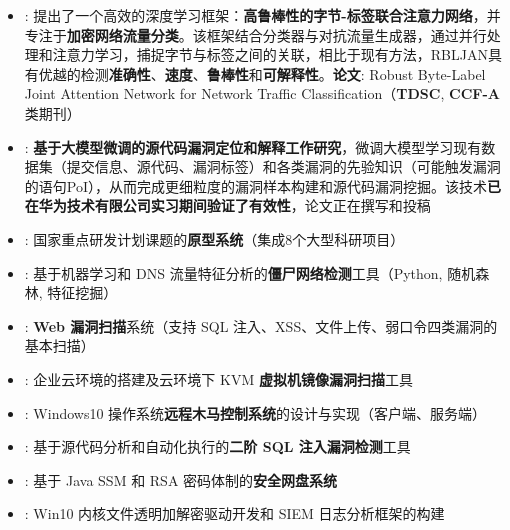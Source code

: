 \documentclass[zh]{resume}
\begin{document}
{}
\vspace{-0.2cm}
\begin{itemize}
  \item {}:
    提出了一个高效的深度学习框架：\textbf{高鲁棒性的字节-标签联合注意力网络}，并专注于\textbf{加密网络流量分类}。该框架结合分类器与对抗流量生成器，通过并行处理和注意力学习，捕捉字节与标签之间的关联，相比于现有方法，RBLJAN具有优越的检测\textbf{准确性}、\textbf{速度}、\textbf{鲁棒性}和\textbf{可解释性}。\textbf{论文}: Robust Byte-Label Joint Attention Network for Network Traffic Classification（\textbf{TDSC}, \textbf{CCF-A}类期刊）
  \item {}:
    \textbf{基于大模型微调的源代码漏洞定位和解释工作研究}，微调大模型学习现有数据集（提交信息、源代码、漏洞标签）和各类漏洞的先验知识（可能触发漏洞的语句PoI），从而完成更细粒度的漏洞样本构建和源代码漏洞挖掘。该技术\textbf{已在华为技术有限公司实习期间验证了有效性}，论文正在撰写和投稿
\end{itemize}
\vspace{-0.1cm}
{}
\vspace{-0.2cm}
\begin{itemize}
  \item {}:
    国家重点研发计划课题的\textbf{原型系统}（集成8个大型科研项目）
  \item {}:
    基于机器学习和 DNS 流量特征分析的\textbf{僵尸网络检测}工具（Python, 随机森林, 特征挖掘）
  \item {}:
   \textbf{ Web 漏洞扫描}系统（支持 SQL 注入、XSS、文件上传、弱口令四类漏洞的基本扫描）
  \item {}:
    企业云环境的搭建及云环境下 KVM \textbf{虚拟机镜像漏洞扫描}工具 
  \item {}:
    Windows10 操作系统\textbf{远程木马控制系统}的设计与实现（客户端、服务端）
  \item {}:
    基于源代码分析和自动化执行的\textbf{二阶 SQL 注入漏洞检测}工具 
  \item {}:
    基于 Java SSM 和 RSA 密码体制的\textbf{安全网盘系统} 
  \item {}:
    Win10 内核文件透明加解密驱动开发和 SIEM 日志分析框架的构建 
\end{itemize}
\end{document}
